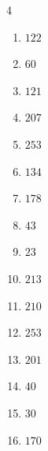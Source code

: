 \begin{multicols}{4}
\begin{enumerate}
  \item $122$


  \item $60$


  \item $121$


  \item $207$


  \item $253$


  \item $134$


  \item $178$


  \item $43$


  \item $23$


  \item $213$


  \item $210$


  \item $253$


  \item $201$


  \item $40$


  \item $30$


\columnbreak %

  \item $170$


\end{enumerate}
\end{multicols}
